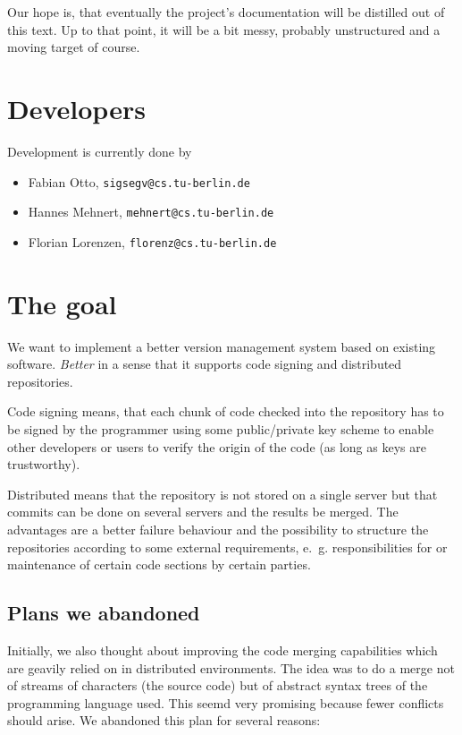 \documentclass[fleqn, 10pt, a4paper]{article}
\begin{document}
Our hope is, that eventually the project's documentation will be
distilled out of this text. Up to that point, it will be a bit messy,
probably unstructured and a moving target of course.


\section{Developers}

Development is currently done by
\begin{itemize}
\item Fabian Otto, \texttt{sigsegv@cs.tu-berlin.de}
\item Hannes Mehnert, \texttt{mehnert@cs.tu-berlin.de}
\item Florian Lorenzen, \texttt{florenz@cs.tu-berlin.de}
\end{itemize}


\section{The goal}

We want to implement a better version management system based on
existing software. \emph{Better} in a sense that it supports
code signing and distributed repositories.

Code signing means, that each chunk of code checked into the repository
has to be signed by the programmer using some public/private key scheme
to enable other developers or users to verify the origin of the code (as
long as keys are trustworthy).

Distributed means that the repository is not stored on a single server
but that commits can be done on several servers and the results be
merged. The advantages are a better failure behaviour and the
possibility to structure the repositories according to some external
requirements, e.~g. responsibilities for or maintenance of certain code
sections by certain parties.

\subsection{Plans we abandoned}

Initially, we also thought about improving the code merging capabilities
which are geavily relied on in distributed environments. The idea was to
do a merge not of streams of characters (the source code) but of
abstract syntax trees of the programming language used. This seemd very
promising because fewer conflicts should arise. We abandoned this plan
for several reasons:
\end{document}
